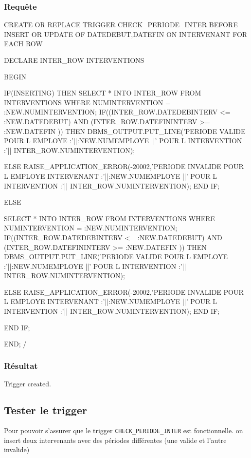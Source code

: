 \documentclass[•]{article}
\begin{document}
\subsubsection{Requête}
\begin{sql}
CREATE OR REPLACE TRIGGER CHECK_PERIODE_INTER 
BEFORE INSERT OR UPDATE OF DATEDEBUT,DATEFIN ON INTERVENANT
FOR EACH ROW

DECLARE
INTER_ROW INTERVENTIONS%

BEGIN

IF(INSERTING) THEN
  SELECT * INTO INTER_ROW FROM INTERVENTIONS WHERE NUMINTERVENTION = :NEW.NUMINTERVENTION;
  IF((INTER_ROW.DATEDEBINTERV <= :NEW.DATEDEBUT) AND (INTER_ROW.DATEFININTERV >= :NEW.DATEFIN ))
	THEN
		DBMS_OUTPUT.PUT_LINE('PERIODE VALIDE POUR L EMPLOYE :'||:NEW.NUMEMPLOYE ||'  POUR L INTERVENTION :'|| INTER_ROW.NUMINTERVENTION);
	
	ELSE RAISE_APPLICATION_ERROR(-20002,'PERIODE INVALIDE POUR L EMPLOYE INTERVENANT :'||:NEW.NUMEMPLOYE ||'  POUR L INTERVENTION :'|| INTER_ROW.NUMINTERVENTION);
  END IF;
  
  ELSE
  
    SELECT * INTO INTER_ROW FROM INTERVENTIONS WHERE NUMINTERVENTION = :NEW.NUMINTERVENTION;
  IF((INTER_ROW.DATEDEBINTERV <= :NEW.DATEDEBUT) AND (INTER_ROW.DATEFININTERV >= :NEW.DATEFIN ))
	THEN
		DBMS_OUTPUT.PUT_LINE('PERIODE VALIDE POUR L EMPLOYE :'||:NEW.NUMEMPLOYE ||'  POUR L INTERVENTION :'|| INTER_ROW.NUMINTERVENTION);
	
	ELSE RAISE_APPLICATION_ERROR(-20002,'PERIODE INVALIDE POUR L EMPLOYE INTERVENANT :'||:NEW.NUMEMPLOYE ||'  POUR L INTERVENTION :'|| INTER_ROW.NUMINTERVENTION);
  END IF;
  
  
  END IF;

END;
/
\end{sql}

\subsubsection{Résultat}
\begin{sql}
Trigger created.
\end{sql}

\subsection{Tester le trigger}
Pour pouvoir s'assurer que le trigger \texttt{CHECK\_PERIODE\_INTER} est fonctionnelle. on insert deux intervenants avec des périodes différentes (une valide et l'autre invalide)
\end{document}

